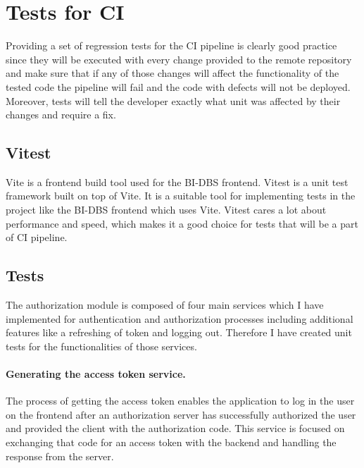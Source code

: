 \section{Tests for CI} Providing a set of regression tests for the CI pipeline is clearly good practice since they will be executed with every change provided to the remote repository and make sure that if any of those changes will affect the functionality of the tested code the pipeline will fail and the code with defects will not be deployed. Moreover, tests will tell the developer exactly what unit was affected by their changes and require a fix.


\subsection{Vitest} Vite is a frontend build tool used for the BI-DBS frontend. Vitest is a unit test framework built on top of Vite. It is a suitable tool for implementing tests in the project like the BI-DBS frontend which uses Vite. Vitest cares a lot about performance and speed, which makes it a good choice for tests that will be a part of CI pipeline. \cite{vitest}

\subsection{Tests} The authorization module is composed of four main services which I have implemented for authentication and authorization processes including additional features like a refreshing of token and logging out. Therefore I have created unit tests for the functionalities of those services.\\


\paragraph*{Generating the access token service.} The process of getting the access token enables the application to log in the user on the frontend after an authorization server has successfully authorized the user and provided the client with the authorization code. This service is focused on exchanging that code for an access token with the backend and handling the response from the server.


